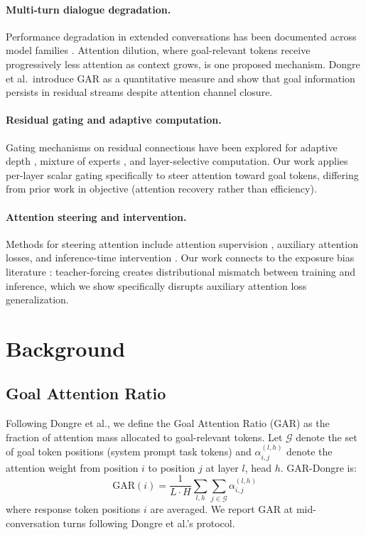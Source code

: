 \documentclass[11pt,a4paper]{article}
\begin{document}
\paragraph{Multi-turn dialogue degradation.}
Performance degradation in extended conversations has been documented across model families \citep{dongre2026gar}. Attention dilution, where goal-relevant tokens receive progressively less attention as context grows, is one proposed mechanism. Dongre et al.\ introduce GAR as a quantitative measure and show that goal information persists in residual streams despite attention channel closure.

\paragraph{Residual gating and adaptive computation.}
Gating mechanisms on residual connections have been explored for adaptive depth \citep{elbayad2020depth}, mixture of experts \citep{shazeer2017moe}, and layer-selective computation. Our work applies per-layer scalar gating specifically to steer attention toward goal tokens, differing from prior work in objective (attention recovery rather than efficiency).

\paragraph{Attention steering and intervention.}
Methods for steering attention include attention supervision \citep{liu2016attn}, auxiliary attention losses, and inference-time intervention \citep{li2023iti}. Our work connects to the exposure bias literature \citep{ranzato2016sequence, bengio2015scheduled}: teacher-forcing creates distributional mismatch between training and inference, which we show specifically disrupts auxiliary attention loss generalization.

\section{Background}

\subsection{Goal Attention Ratio}

Following Dongre et al., we define the Goal Attention Ratio (GAR) as the fraction of attention mass allocated to goal-relevant tokens. Let $\mathcal{G}$ denote the set of goal token positions (system prompt task tokens) and $\alpha_{i,j}^{(l,h)}$ denote the attention weight from position $i$ to position $j$ at layer $l$, head $h$. GAR-Dongre is:
\begin{equation}
\text{GAR}(i) = \frac{1}{L \cdot H} \sum_{l,h} \sum_{j \in \mathcal{G}} \alpha_{i,j}^{(l,h)}
\end{equation}
where response token positions $i$ are averaged. We report GAR at mid-conversation turns following Dongre et al.'s protocol.
\end{document}
